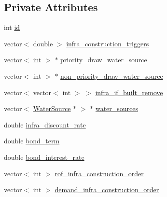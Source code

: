\subsection*{Private Attributes}
\begin{DoxyCompactItemize}
\item 
int \mbox{\hyperlink{classInfrastructureManager_a9c721676ab3c35a247c818bf34fd482e_a9c721676ab3c35a247c818bf34fd482e}{id}}
\item 
vector$<$ double $>$ \mbox{\hyperlink{classInfrastructureManager_a5b09482bd9fc258a3da82a86b157a2c3_a5b09482bd9fc258a3da82a86b157a2c3}{infra\+\_\+construction\+\_\+triggers}}
\item 
vector$<$ int $>$ $\ast$ \mbox{\hyperlink{classInfrastructureManager_ac8aa84e40d3ef4e4ee7ba6536ca55619_ac8aa84e40d3ef4e4ee7ba6536ca55619}{priority\+\_\+draw\+\_\+water\+\_\+source}}
\item 
vector$<$ int $>$ $\ast$ \mbox{\hyperlink{classInfrastructureManager_a4034272cf63082614f5519b0909acb3d_a4034272cf63082614f5519b0909acb3d}{non\+\_\+priority\+\_\+draw\+\_\+water\+\_\+source}}
\item 
vector$<$ vector$<$ int $>$ $>$ \mbox{\hyperlink{classInfrastructureManager_a6505122b584011bd852a126616bf442a_a6505122b584011bd852a126616bf442a}{infra\+\_\+if\+\_\+built\+\_\+remove}}
\item 
vector$<$ \mbox{\hyperlink{classWaterSource}{Water\+Source}} $\ast$ $>$ $\ast$ \mbox{\hyperlink{classInfrastructureManager_a2b8810958d40b9c80d299c6db31715e2_a2b8810958d40b9c80d299c6db31715e2}{water\+\_\+sources}}
\item 
double \mbox{\hyperlink{classInfrastructureManager_a44099d2523ff67773ffb853e2c9871b3_a44099d2523ff67773ffb853e2c9871b3}{infra\+\_\+discount\+\_\+rate}}
\item 
double \mbox{\hyperlink{classInfrastructureManager_a6c8010bc7c65fac8411431e5c7a8d3e4_a6c8010bc7c65fac8411431e5c7a8d3e4}{bond\+\_\+term}}
\item 
double \mbox{\hyperlink{classInfrastructureManager_ab8ddaa0ed220e29bc296470b7a905a3b_ab8ddaa0ed220e29bc296470b7a905a3b}{bond\+\_\+interest\+\_\+rate}}
\item 
vector$<$ int $>$ \mbox{\hyperlink{classInfrastructureManager_a21b02e6d9ca7f90cfb289a48cec723cb_a21b02e6d9ca7f90cfb289a48cec723cb}{rof\+\_\+infra\+\_\+construction\+\_\+order}}
\item 
vector$<$ int $>$ \mbox{\hyperlink{classInfrastructureManager_a9b2adee9527d11de87069901e86b540a_a9b2adee9527d11de87069901e86b540a}{demand\+\_\+infra\+\_\+construction\+\_\+order}}

\end{DoxyCompactItemize}
